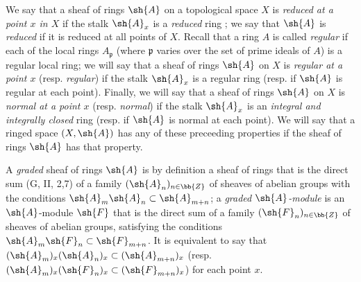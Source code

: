 \begin{env}[4.1.4]
\label{0.4.1.4}
We say that a sheaf of rings $\sh{A}$ on a topological space $X$ is
\emph{reduced at a point $x$ in $X$} if the stalk $\sh{A}_x$ is a \emph{reduced}
ring ; we say that $\sh{A}$ is \emph{reduced} if it is reduced
at all points of $X$. Recall that a ring $A$ is called \emph{regular} if each of
the local rings $A_\mathfrak{p}$ (where $\mathfrak{p}$ varies over the set of
prime ideals of $A$) is a regular local ring; we will say that a sheaf of rings
$\sh{A}$ on $X$ is \emph{regular at a point $x$} (resp. \emph{regular}) if the
stalk $\sh{A}_x$ is a regular ring (resp. if $\sh{A}$ is regular at each point).
Finally, we will say that a sheaf of rings $\sh{A}$ on $X$ is \emph{normal at a
point $x$} (resp. \emph{normal}) if the stalk $\sh{A}_x$ is an \emph{integral
and integrally closed} ring (resp. if $\sh{A}$ is normal at each point). We will
say that a ringed space $(X,\sh{A})$ has any of these preceeding properties if
the sheaf of rings $\sh{A}$ has that property.

A \emph{graded} sheaf of rings $\sh{A}$ is by definition a sheaf of rings that
is the direct sum (G, II, 2,7) of a family $(\sh{A}_n)_{n\in\bb{Z}}$ of sheaves
of abelian groups with the conditions $\sh{A}_m\sh{A}_n\subset\sh{A}_{m+n}$; a
\emph{graded $\sh{A}$-module} is an $\sh{A}$-module $\sh{F}$ that is the direct
sum of a family $(\sh{F}_n)_{n\in\bb{Z}}$ of sheaves of abelian groups,
satisfying the conditions $\sh{A}_m\sh{F}_n\subset\sh{F}_{m+n}$. It is
equivalent to say that $(\sh{A}_m)_x(\sh{A}_n)_x\subset(\sh{A}_{m+n})_x$
(resp. $(\sh{A}_m)_x(\sh{F}_n)_x\subset(\sh{F}_{m+n})_x$) for each point $x$.
\end{env}

